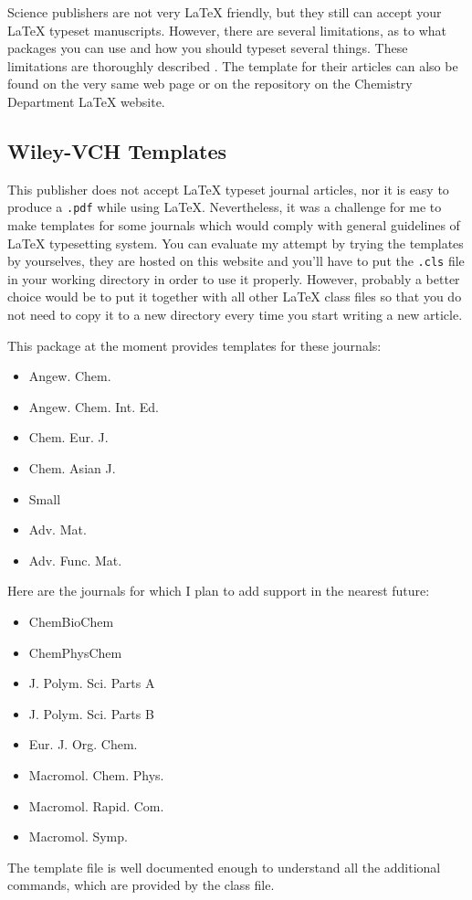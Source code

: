 \documentclass[
]{scrartcl}
\begin{document}
Science publishers are not very \LaTeX{} friendly, but they still can accept
    your \LaTeX{} typeset manuscripts.
%
However, there are several limitations, as to what packages you can use and how
    you should typeset several things.
%
These limitations are thoroughly described
    .
%
The template for their articles can also be found on the very same web page or
    on the repository on the Chemistry Department \LaTeX{} website.

%
\subsection{Wiley-VCH Templates}

This publisher does not accept \LaTeX{} typeset journal articles, nor it is easy
    to produce a \verb|.pdf| while using \LaTeX{}.
%
Nevertheless, it was a challenge for me to make templates for some journals
    which would comply with general guidelines of \LaTeX{} typesetting system.
%
You can evaluate my attempt by trying the templates by yourselves, they are
    hosted on this website and you'll have to put the \verb|.cls| file in your
    working directory in order to use it properly.
%
However, probably a better choice would be to put it together with all other
    \LaTeX{} class files so that you do not need to copy it to a new directory
    every time you start writing a new article.

%
This package at the moment provides templates for these journals:
%
\begin{itemize}
    \item Angew. Chem.
    \item Angew. Chem. Int. Ed.
    \item Chem. Eur. J.
    \item Chem. Asian J.
    \item Small
    \item Adv. Mat.
    \item Adv. Func. Mat.
\end{itemize}
%
Here are the journals for which I plan to add support in the nearest future:
%
\begin{itemize}
    \item ChemBioChem
    \item ChemPhysChem
    \item J. Polym. Sci. Parts A
    \item J. Polym. Sci. Parts B
    \item Eur. J. Org. Chem.
    \item Macromol. Chem. Phys.
    \item Macromol. Rapid. Com.
    \item Macromol. Symp.
\end{itemize}
%
The template file is well documented enough to understand all the additional
    commands, which are provided by the class file.
\end{document}
